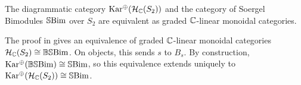 \begin{theorem} \label{thm:one-col-sbim-equiv}
    The diagrammatic category $\operatorname{Kar^\oplus}(\mathcal{H}_{\mathbb{C}}(S_2))$ and the category of Soergel Bimodules $\operatorname{\mathbb{S}Bim}$ over $S_2$ are equivalent as graded $\mathbb{C}$-linear monoidal categories.
\end{theorem}
The proof in \cite{elias-williamson-soergel-calculus} gives an equivalence of graded $\mathbb{C}$-linear monoidal categories $\mathcal{H}_{\mathbb{C}}(S_2) \cong \operatorname{\mathbb{BS}Bim}$. On objects, this sends $s$ to $B_s$. By construction, $\operatorname{Kar^\oplus}(\operatorname{\mathbb{BS}Bim}) \cong \operatorname{\mathbb{S}Bim}$, so this equivalence extends uniquely to $\operatorname{Kar^\oplus}(\mathcal{H}_{\mathbb{C}}(S_2)) \cong \operatorname{\mathbb{S}Bim}$.

